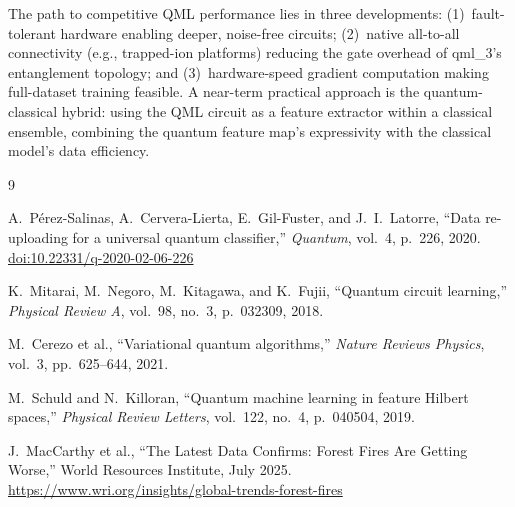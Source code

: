 \documentclass[11pt,a4paper]{article}
\begin{document}
The path to competitive QML performance lies in three developments:
(1)~fault-tolerant hardware enabling deeper, noise-free circuits;
(2)~native all-to-all connectivity (e.g., trapped-ion platforms) reducing
the gate overhead of qml\_3's entanglement topology; and
(3)~hardware-speed gradient computation making full-dataset training feasible.
A near-term practical approach is the quantum-classical hybrid: using the
QML circuit as a feature extractor within a classical ensemble, combining
the quantum feature map's expressivity with the classical model's data efficiency.

\begin{thebibliography}{9}

A.~P\'{e}rez-Salinas, A.~Cervera-Lierta, E.~Gil-Fuster, and J.~I.~Latorre,
``Data re-uploading for a universal quantum classifier,''
\textit{Quantum}, vol.~4, p.~226, 2020.
\href{https://doi.org/10.22331/q-2020-02-06-226}{doi:10.22331/q-2020-02-06-226}

K.~Mitarai, M.~Negoro, M.~Kitagawa, and K.~Fujii,
``Quantum circuit learning,''
\textit{Physical Review A}, vol.~98, no.~3, p.~032309, 2018.

M.~Cerezo et al.,
``Variational quantum algorithms,''
\textit{Nature Reviews Physics}, vol.~3, pp.~625--644, 2021.

M.~Schuld and N.~Killoran,
``Quantum machine learning in feature Hilbert spaces,''
\textit{Physical Review Letters}, vol.~122, no.~4, p.~040504, 2019.

J.~MacCarthy et al.,
``The Latest Data Confirms: Forest Fires Are Getting Worse,''
World Resources Institute, July 2025.
\url{https://www.wri.org/insights/global-trends-forest-fires}

\end{thebibliography}
\end{document}

